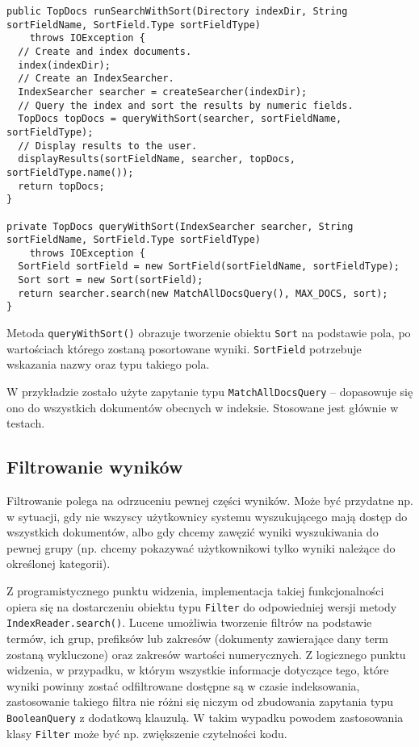\begin{lstlisting}
public TopDocs runSearchWithSort(Directory indexDir, String sortFieldName, SortField.Type sortFieldType)
    throws IOException {
  // Create and index documents.  
  index(indexDir);
  // Create an IndexSearcher.
  IndexSearcher searcher = createSearcher(indexDir);
  // Query the index and sort the results by numeric fields.
  TopDocs topDocs = queryWithSort(searcher, sortFieldName, sortFieldType);
  // Display results to the user.
  displayResults(sortFieldName, searcher, topDocs, sortFieldType.name());
  return topDocs;
}

private TopDocs queryWithSort(IndexSearcher searcher, String sortFieldName, SortField.Type sortFieldType)
    throws IOException {
  SortField sortField = new SortField(sortFieldName, sortFieldType);
  Sort sort = new Sort(sortField);
  return searcher.search(new MatchAllDocsQuery(), MAX_DOCS, sort);
}
\end{lstlisting}

Metoda \texttt{queryWithSort()} obrazuje tworzenie obiektu \texttt{Sort} na podstawie pola, po wartościach którego zostaną posortowane wyniki. \texttt{SortField} potrzebuje wskazania nazwy oraz typu takiego pola. 

W przykładzie zostało użyte zapytanie typu \texttt{MatchAllDocsQuery} -- dopasowuje się ono do wszystkich dokumentów obecnych w indeksie. Stosowane jest głównie w testach.

\subsection{Filtrowanie wyników}

Filtrowanie polega na odrzuceniu pewnej części wyników. Może być przydatne np. w sytuacji, gdy nie wszyscy użytkownicy systemu wyszukującego mają dostęp do wszystkich dokumentów, albo gdy chcemy zawęzić wyniki wyszukiwania do pewnej grupy (np. chcemy pokazywać użytkownikowi tylko wyniki należące do określonej kategorii).

Z programistycznego punktu widzenia, implementacja takiej funkcjonalności opiera się na dostarczeniu obiektu typu \texttt{Filter} do odpowiedniej wersji metody \texttt{IndexReader.search()}. Lucene umożliwia tworzenie filtrów na podstawie termów, ich grup, prefiksów lub zakresów (dokumenty zawierające dany term zostaną wykluczone) oraz zakresów wartości numerycznych. Z logicznego punktu widzenia, w przypadku, w którym wszystkie informacje dotyczące tego, które wyniki powinny zostać odfiltrowane dostępne są w czasie indeksowania, zastosowanie takiego filtra nie różni się niczym od zbudowania zapytania typu \texttt{BooleanQuery} z dodatkową klauzulą. W takim wypadku powodem zastosowania klasy \texttt{Filter} może być np. zwiększenie czytelności kodu. 


